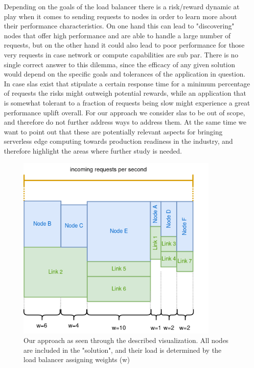 Depending on the goals of the load balancer there is a risk/reward dynamic at play when it comes to sending requests to nodes in order to learn more about their performance characteristics. On one hand this can lead to "discovering" nodes that offer high performance and are able to handle a large number of requests, but on the other hand it could also lead to poor performance for those very requests in case network or compute capabilities are sub par.
There is no single correct answer to this dilemma, since the efficacy of any given solution would depend on the specific goals and tolerances of the application in question. In case \glspl{sla} exist that stipulate a certain response time for a minimum percentage of requests the risks might outweigh potential rewards, while an application that is somewhat tolerant to a fraction of requests being slow might experience a great performance uplift overall.
For our approach we consider \glspl{sla} to be out of scope, and therefore do not further address ways to address them. At the same time we want to point out that these are potentially relevant aspects for bringing serverless edge computing towards production readiness in the industry, and therefore highlight the areas where further study is needed.

\begin{figure}
    \centering
    \includegraphics[width=10cm]{graphics/diagrams/lb_weights.png}
    \caption{Our approach as seen through the described visualization. All nodes are included in the "solution", and their load is determined by the load balancer assigning weights (w)}
    \label{fig:lb_weights}
\end{figure}

